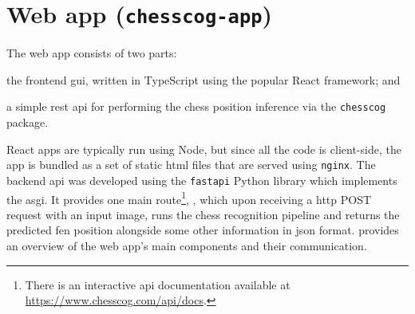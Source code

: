 \documentclass[../report.tex]{subfiles}
\begin{document}
\section{Web app (\texttt{chesscog-app})}
\label{sec:implementation_chesscogapp}
The web app consists of two parts:
\begin{enumerate*}[label=(\roman*)]
    \item the frontend \gls{gui}, written in TypeScript using the popular React framework; and
    \item a simple \gls{rest} \gls{api} for performing the chess position inference via the \texttt{chesscog} package.
\end{enumerate*}
React apps are typically run using Node, but since all the code is client-side, the app is bundled as a set of static \gls{html} files that are served using \texttt{nginx}.
The backend \gls{api} was developed using the \texttt{fastapi} Python library which implements the \gls{asgi}.
It provides one main route\footnote{There is an interactive \gls{api} documentation available at \url{https://www.chesscog.com/api/docs}.}, , which upon receiving a \gls{http} POST request with an input image, runs the chess recognition pipeline and returns the predicted \gls{fen} position alongside some other information in \gls{json} format.
 provides an overview of the web app's main components and their communication.
\end{document}
